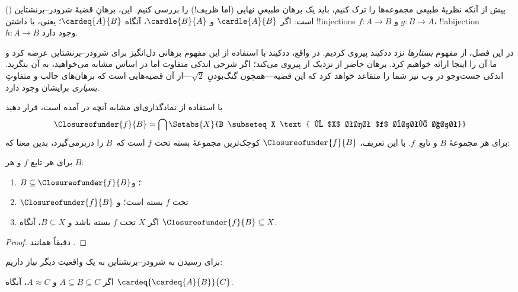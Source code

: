 \documentclass[../../../include/open-logic-section]{subfiles}
\begin{document}


پیش از آنکه نظریهٔ طبیعی مجموعه‌ها را ترک کنیم، باید یک برهان طبیعیِ نهایی
(اما ظریف!) را بررسی کنیم. این، برهانِ قضیهٔ شرودر–برنشتاین
() است: اگر
$\cardle{A}{B}$ و $\cardle{B}{A}$، آنگاه $\cardeq{A}{B}$؛ یعنی، با داشتن
!!{injection}s $f \colon A \to B$ و $g \colon B \to A$، !!a{bijection}
$h \colon A \to B$ وجود دارد.

در این فصل، از مفهوم \emph{بستارها} نزد ددکیند پیروی کردیم. در واقع،
ددکیند با استفاده از این مفهوم برهانی دل‌انگیز برای شرودر–برنشتاین عرضه
کرد و ما آن را اینجا ارائه خواهیم کرد. برهان حاضر از نزدیک از
\citet[صص.~157--8]{Potter2004} پیروی می‌کند؛ اگر شرحی اندکی متفاوت اما در
اساس مشابه می‌خواهید، به آن بنگرید. اندکی جست‌وجو در وب نیز شما را متقاعد خواهد کرد که این
قضیه---همچون گنگ‌بودنِ $\sqrt{2}$---از آن قضیه‌هایی است که برهان‌های جالب
و متفاوتِ \emph{بسیاری} برایشان وجود دارد.

با استفاده از نمادگذاری‌ای مشابه آنچه در  آمده است،
قرار دهید
\[
\Closureofunder{f}{B} = \bigcap \Setabs{X}{B \subseteq X
\text{ و $X$ تحت $f$ بسته است}}
\]
برای هر مجموعهٔ $B$ و تابع~$f$. با این تعریف، $\Closureofunder{f}{B}$
کوچک‌ترین مجموعهٔ بسته تحت $f$ است
که~$B$ را دربرمی‌گیرد، بدین معنا که:

\begin{lem}
	برای هر تابع $f$ و هر $B$:
	\begin{enumerate}
		\item{} $B \subseteq \Closureofunder{f}{B}$؛ و
		\item{} $\Closureofunder{f}{B}$ تحت $f$ بسته است؛ و
		\item{} اگر $X$ تحت $f$ بسته باشد و $B
		\subseteq X$، آنگاه $\Closureofunder{f}{B} \subseteq X$.
	\end{enumerate}
\end{lem}

\begin{proof}
دقیقاً همانند .
\end{proof}

برای رسیدن به شرودر–برنشتاین به یک واقعیت دیگر نیاز داریم:

\begin{prop}
اگر $A \subseteq B \subseteq C$ و $A \approx C$، آنگاه $\cardeq{\cardeq{A}{B}}{C}$.
\end{prop}
\end{document}

